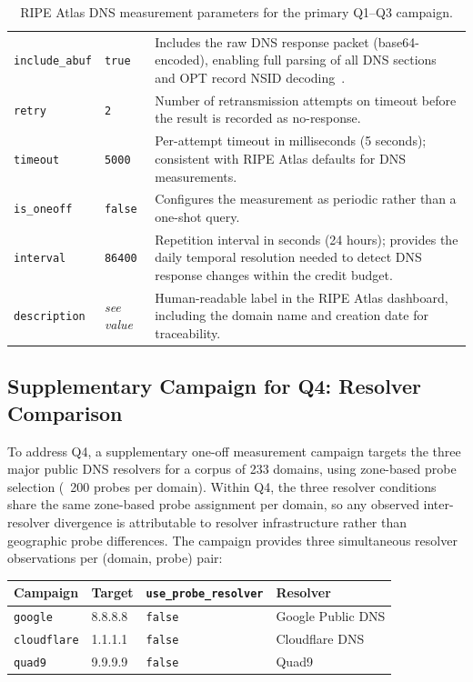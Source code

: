 \begin{table}[H]
\begin{tabularx}{\linewidth}{l l X}
\texttt{include\_abuf} & \texttt{true} & Includes the raw \ac{DNS} response packet (base64-encoded), enabling full parsing of all \ac{DNS} sections and OPT record \ac{NSID} decoding~\cite{RFC5001}. \\
\texttt{retry} & \texttt{2} & Number of retransmission attempts on timeout before the result is recorded as no-response. \\
\texttt{timeout} & \texttt{5000} & Per-attempt timeout in milliseconds (5 seconds); consistent with RIPE Atlas defaults for \ac{DNS} measurements. \\
\texttt{is\_oneoff} & \texttt{false} & Configures the measurement as periodic rather than a one-shot query. \\
\texttt{interval} & \texttt{86400} & Repetition interval in seconds (24 hours); provides the daily temporal resolution needed to detect \ac{DNS} response changes within the credit budget. \\
\texttt{description} & \textit{see value} & Human-readable label in the RIPE Atlas dashboard, including the domain name and creation date for traceability. \\
\bottomrule
\end{tabularx}
\caption{RIPE Atlas \ac{DNS} measurement parameters for the primary Q1--Q3 campaign.}
\label{tab:msm_params}
\end{table}

\subsection{Supplementary Campaign for Q4: Resolver Comparison}
\label{subsec:3.3.3}

To address Q4, a supplementary one-off measurement campaign targets the three major public \ac{DNS} resolvers for a corpus of 233 domains, using zone-based probe selection (~200 probes per domain). Within Q4, the three resolver conditions share the same zone-based probe assignment per domain, so any observed inter-resolver divergence is attributable to resolver infrastructure rather than geographic probe differences. The campaign provides three simultaneous resolver observations per (domain, probe) pair:

\begin{table}[H]
\centering
\small
\begin{tabular}{l l l l}
\toprule
\textbf{Campaign} & \textbf{Target} & \textbf{\texttt{use\_probe\_resolver}} & \textbf{Resolver} \\
\midrule
\texttt{google}     & 8.8.8.8 & \texttt{false} & Google Public \ac{DNS} \\
\texttt{cloudflare} & 1.1.1.1 & \texttt{false} & Cloudflare \ac{DNS} \\
\texttt{quad9}      & 9.9.9.9 & \texttt{false} & Quad9 \\
\bottomrule
\end{tabular}
\end{table}

